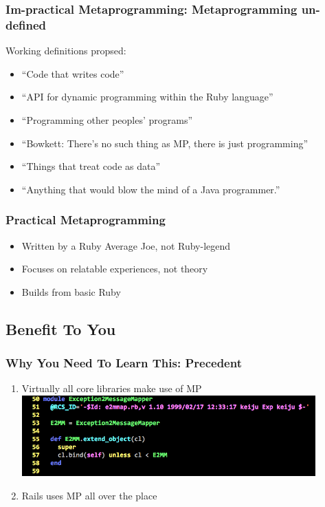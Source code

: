 \documentclass[slidestop,compress,mathserif]{beamer}
\begin{document}
\begin{frame}
	\frametitle{\textbf{Im}-practical Metaprogramming:  Metaprogramming \textbf{un}-defined}
	Working definitions propsed:
	\begin{itemize}
		\item ``Code that writes code''
		\pause
		\item ``API for dynamic programming within the Ruby language''
		\pause
		\item ``Programming other peoples' programs''
		\pause
		\item ``Bowkett:  There's no such thing as MP, there is just programming''
		\pause
		\item ``Things that treat code as data''
		\pause
		\item ``Anything that would blow the mind of a Java programmer.''
	\end{itemize}
\end{frame}

\begin{frame}
	\frametitle{Practical Metaprogramming}
	\begin{itemize}
		\pause
		\item Written by a Ruby Average Joe{\texttrademark}, not Ruby-legend
		\pause
		\item Focuses on relatable experiences, not theory
		\pause
		\item Builds from basic Ruby
	\end{itemize}
\end{frame}

\subsection{Benefit To You} %
\label{sub:benefits}

\begin{frame}
	\frametitle{Why You Need To Learn This:  Precedent}
	\begin{enumerate}
		\item Virtually all core libraries make use of MP
		\pause
		\includegraphics[scale=0.45, width=0.89\textwidth]{img/e2mmap.png}
		\pause
		\item Rails uses MP all over the place
	\end{enumerate}
\end{frame}
\end{document}
